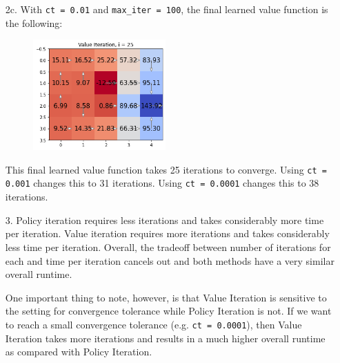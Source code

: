 \documentclass[submit]{harvardml}
\begin{document}
\begin{itemize}
    \item[2c.]
    With \texttt{ct = 0.01} and \texttt{max\_iter = 100}, the final learned value function is the 
    following:
    \begin{figure}[H]
        \centering
        \includegraphics[width=0.48\textwidth]{hw6_2c}
    \end{figure}
    This final learned value function takes 25 iterations to converge. Using 
    \texttt{ct = 0.001} changes this to 31 iterations.
    Using \texttt{ct = 0.0001} changes this to 38 iterations.
    
    \item[3.]
    Policy iteration requires less iterations and takes considerably more time 
    per iteration.
    Value iteration requires more iterations and takes considerably less time 
    per iteration. 
    Overall, the tradeoff between number of iterations for each and time per iteration 
    cancels out and both methods have a very similar overall runtime.

    One important thing to note, however, is that Value Iteration is sensitive 
    to the setting for convergence tolerance while Policy Iteration is not.
    If we want to reach a small convergence tolerance (e.g. \texttt{ct = 0.0001}), then Value Iteration
    takes more iterations and results in a much higher overall runtime as compared
    with Policy Iteration.


\end{itemize}
\end{document}
